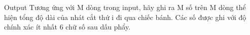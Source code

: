 Output
Tương ứng với M dòng trong input, hãy ghi ra M số trên M dòng thể hiện tổng độ dài của nhát cắt thứ i đi qua chiếc bánh. Các số được ghi với độ chính xác ít nhất 6 chữ số sau dấu phẩy.